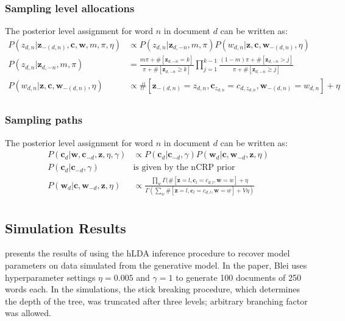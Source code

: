 \documentclass{article}
\begin{document}
\subsubsection{Sampling level allocations}
The posterior level assignment for word $n$ in document $d$ can be written as:
\begin{equation}
\begin{split}
  P(z_{d,n} | \mathbf{z}_{-(d,n)}, \mathbf{c}, \mathbf{w}, m, \pi, \eta) & \propto P(z_{d,n} | \mathbf{z}_{d, -n}, m, \pi) P(w_{d,n} | \mathbf{z}, \mathbf{c}, \mathbf{w}_{-(d,n)}, \eta) \\
P(z_{d,n} | \mathbf{z}_{d, -n}, m, \pi) & = \frac{m\pi + \#[\mathbf{z}_{d, -n} = k]}{\pi + \#[\mathbf{z}_{d, -n} \geq k]} \prod_{j = 1}^{k-1} \frac{(1-m)\pi + \#[\mathbf{z}_{d, -n} > j]}{\pi + \#[\mathbf{z}_{d, -n} \geq j]} \\
  P(w_{d,n} | \mathbf{z}, \mathbf{c}, \mathbf{w}_{-(d,n)}, \eta) & \propto \#[\mathbf{z}_{-(d,n)} = z_{d,n}, \mathbf{c}_{z_{d,n}} = c_{d,z_{d,n}}, \mathbf{w}_{-(d,n)} = w_{d,n}] + 
  \eta\\
\end{split}
\label{eq2}
\end{equation}

\subsubsection{Sampling paths}
The posterior level assignment for word $n$ in document $d$ can be written as:
\begin{equation}
\begin{split}
  P(\mathbf{c}_d | \mathbf{w}, \mathbf{c}_{-d}, \mathbf{z}, \eta, \gamma) & \propto P(\mathbf{c}_{d} | \mathbf{c}_{-d}, \gamma) P(\mathbf{w}_{d} | \mathbf{c}, \mathbf{w}_{-d}, \mathbf{z},\eta) \\
  P(\mathbf{c}_{d} | \mathbf{c}_{-d}, \gamma)  & \text{is given by the nCRP prior} \\
  P(\mathbf{w}_{d} | \mathbf{c}, \mathbf{w}_{-d}, \mathbf{z},\eta) & \propto \frac{\prod_w \Gamma (\#[\mathbf{z} = l, \mathbf{c}_{l} = c_{d,l}, \mathbf{w} = w] + \eta}{\Gamma (\sum_w \#[\mathbf{z} = l, \mathbf{c}_{l} = c_{d,l}, \mathbf{w} = w] + V\eta)}\\
\end{split}
\label{eq1}
\end{equation}

\subsection{Simulation Results}
\cite{Blei2010} presents the results of using the hLDA inference procedure to recover model parameters on data simulated from the generative model. In the paper, Blei uses hyperparameter settings $\eta = 0.005$ and $\gamma = 1$ to generate 100 documents of 250 words each. In the simulations, the stick breaking procedure, which determines the depth of the tree, was truncated after three levels; arbitrary branching factor was allowed. 
\end{document}
